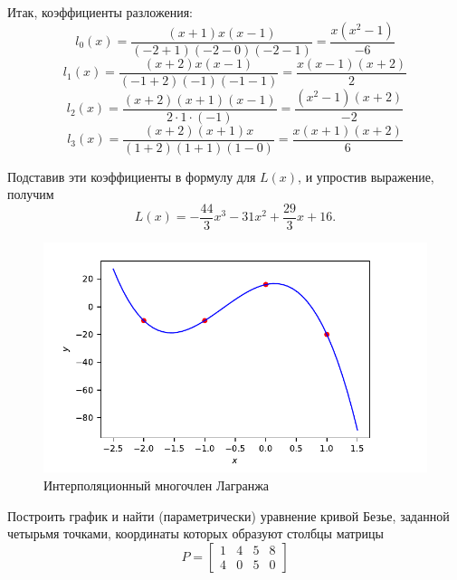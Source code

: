 Итак, коэффициенты разложения:
\begin{equation*}
    l_0(x) = \frac{(x + 1)x(x - 1)}{(-2 + 1)(-2 - 0)(-2 - 1)} =
    \frac{x(x^2 - 1)}{-6}
\end{equation*}
\begin{equation*}
    l_1(x) = \frac{(x + 2)x(x-1)}{(-1 + 2)(-1)(-1 - 1)} =
    \frac{x(x-1)(x+2)}{2}
\end{equation*}
\begin{equation*}
    l_2(x) = \frac{(x + 2)(x + 1)(x - 1)}{2 \cdot 1 \cdot (-1)} =
    \frac{(x^2-1)(x+2)}{-2}
\end{equation*}
\begin{equation*}
    l_3(x) = \frac{(x + 2)(x + 1) x}{(1 + 2)(1 + 1)(1 - 0)} =
    \frac{x(x+1)(x+2)}{6}
\end{equation*}

Подставив эти коэффициенты в формулу для $L(x)$, и упростив выражение, получим
\begin{equation*}
    L(x) = -\frac{44}{3}x^3 - 31x^2 + \frac{29}{3}x + 16.
\end{equation*}

\begin{figure}[hbt]
    \centering
    \includegraphics*[scale=1.0]{./figures/ex3.pdf}
    \caption{Интерполяционный многочлен Лагранжа}
\end{figure}

\newpage
\begin{problem}
    Построить график и найти (параметрически) уравнение кривой Безье, заданной
    четырьмя точками, координаты которых образуют столбцы матрицы
    \begin{equation*}
        P =
        \begin{bmatrix}
            1 & 4 & 5 & 8\\
            4 & 0 & 5 & 0
        \end{bmatrix}
    \end{equation*}
\end{problem}

